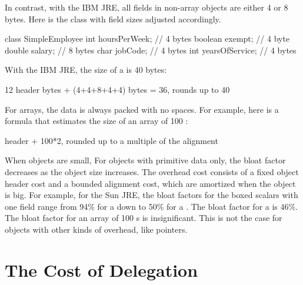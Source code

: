 In contrast, with the IBM JRE, all fields in non-array objects are either 4 or
8 bytes.  Here is the  class with field sizes adjusted
accordingly.
\begin{verbatim2} 
class SimpleEmployee {
    int hoursPerWeek;        // 4 bytes
    boolean exempt;          // 4 byte
    double salary;           // 8 bytes
    char jobCode;            // 4 bytes
    int yearsOfService;      // 4 bytes
}
\end{verbatim2}
With the IBM JRE, the size of a  is 40 bytes:
\begin{verbatim2}
12 header bytes + (4+4+8+4+4) bytes = 36, rounds up to 40
\end{verbatim2}
For arrays, the data is always packed with no spaces. For example, here is a
formula that estimates the size of an array of 100 :
\begin{verbatim2}
header + 100*2, rounded up to a multiple of the alignment
\end{verbatim2}

When objects are small, For objects with primitive data only, the bloat factor
decreases as the object size increases. The overhead cost consists of a fixed
object header cost and a bounded alignment cost, which are amortized when the
object is big.  For example, for the Sun JRE, the bloat factors for the boxed
scalars with one field range from 94\% for a  down to 50\% for a
.  The bloat factor for a  is 46\%.  The
bloat factor for an array of 100 s is insignificant. This is not the
case for objects with other kinds of overhead, like pointers.

\section{The Cost of Delegation}

